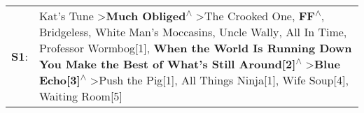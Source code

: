 \begin{supertabular}{p{0.03\textwidth}p{0.92\textwidth}}
 \textbf{S1}:  &  Kat's Tune\textsuperscript{} \textgreater \enspace \textbf{Much Obliged\textsuperscript{$\wedge$}} \textgreater \enspace The Crooked One\textsuperscript{}, \enspace \textbf{FF\textsuperscript{$\wedge$}}, \enspace Bridgeless\textsuperscript{}, \enspace White Man's Moccasins\textsuperscript{}, \enspace Uncle Wally\textsuperscript{}, \enspace All In Time\textsuperscript{}, \enspace Professor Wormbog[1]\textsuperscript{}, \enspace \textbf{When the World Is Running Down You Make the Best of What's Still Around[2]\textsuperscript{$\wedge$}} \textgreater \enspace \textbf{Blue Echo[3]\textsuperscript{$\wedge$}} \textgreater \enspace Push the Pig[1]\textsuperscript{}, \enspace All Things Ninja[1]\textsuperscript{}, \enspace Wife Soup[4]\textsuperscript{}, \enspace Waiting Room[5]\textsuperscript{}  \enspace  \\
\end{supertabular}
